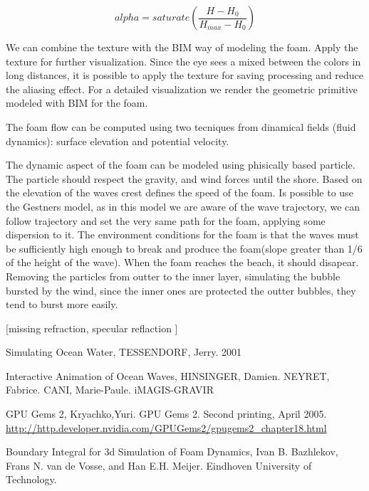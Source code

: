 \documentclass{report}
\begin{document}
\begin{equation}
alpha=saturate(\frac{H-H_0}{H_{max} - H_0})
\label{equa:transparency}
\end{equation}

We can combine the texture with the BIM way of modeling the foam. Apply the texture for further visualization. Since the eye sees a mixed between the colors in long distances, it is possible to apply the texture for saving processing and reduce the aliasing effect.
For a detailed visualization we render the geometric primitive modeled with BIM for the foam.

The foam flow can be computed using two tecniques from dinamical fields (fluid dynamics): surface elevation and potential velocity.

The dynamic aspect of the foam can be modeled using phisically based particle. The particle should respect the gravity, and wind forces until the shore. Based on the elevation of the waves crest defines the speed of the foam. Is possible to use the Gestners model, as in this model we are aware of the wave trajectory, we can follow trajectory and set the very same path for the foam, applying some dispersion to it\cite{iaow}.
The environment conditions for the foam is that the waves must be sufficiently high enough to break and produce the foam(slope greater than 1/6 \cite{sow} of the height of the wave).
When the foam reaches the beach, it should disapear. Removing the particles from outter to the inner layer, simulating the bubble bursted by the wind, since the inner ones are protected the outter bubbles, they tend to burst more easily.

[missing refraction, specular reflaction ]


\begin{thebibliography}{9}

  Simulating Ocean Water,
  TESSENDORF, Jerry.
  2001

  Interactive Animation of Ocean Waves,
  HINSINGER, Damien. NEYRET, Fabrice. CANI, Marie-Paule.
  iMAGIS-GRAVIR

  GPU Gems 2,
  Kryachko,Yuri.
  GPU Gems 2. 
  Second printing, April 2005.
  \url{http://http.developer.nvidia.com/GPUGems2/gpugems2_chapter18.html}

  Boundary Integral for 3d Simulation of Foam Dynamics,
  Ivan B. Bazhlekov, Frans N. van de Vosse, and Han E.H. Meijer.
  Eindhoven University of Technology.

\end{thebibliography}
\end{document}

